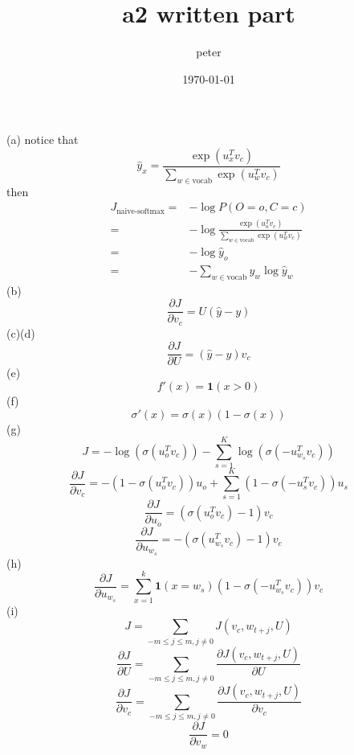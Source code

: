 \documentclass[UTF8]{ctexart}
\title{a2 written part}
\author{peter}
\date{\today}
\begin{document}
\maketitle
\noindent
(a) notice that
\begin{equation}
	{\hat{y}}_x = \frac{\exp{{(u^T_xv_c)}}}{\sum\limits_{w\in\text{vocab}}\exp{(u^T_wv_c)}}
	\end{equation}
then
\begin{align}
J_{\text{naive-softmax}} =& -\log P(O=o, C=c)\\
=&-\log\frac{\exp{{(u^T_ov_c)}}}{\sum\limits_{w\in\text{vocab}}\exp{(u^T_wv_c)}}\\
=&-\log\hat{y}_o\\
=&-\sum\limits_{w\in\text{vocab}}y_w\log{\hat{y}_w}
\end{align}
(b)
\begin{equation}
    \frac{\partial{J}}{\partial{v_c}} = U(\hat{y}-y)
\end{equation}
(c)(d)
\begin{equation}
    \frac{\partial{J}}{\partial{U}} = (\hat{y}-y)v_c
\end{equation}
(e)
\begin{equation}
    f'(x) = \mathbf{1}(x>0) 
\end{equation}
(f)
\begin{equation}
    \sigma '(x) = \sigma (x)(1-\sigma (x))
\end{equation}
(g)
\begin{equation}
    J = -\log(\sigma(u^T_o v_c))
    - \sum\limits_{s=1}^K \log (\sigma (-u^T_{w_s}v_c))
\end{equation}
\begin{equation}
    \frac{\partial{J}}{\partial{v_c}} = 
    - (1-\sigma(u_o^T v_c))u_o +
    \sum\limits_{s=1}^K (1-\sigma(-u_s^T v_c))u_s 
\end{equation}
\begin{equation}
    \frac{\partial{J}}{\partial{u_o}} = 
    (\sigma(u_o^T v_c)-1)v_c
\end{equation}
\begin{equation}
    \frac{\partial{J}}{\partial{u_{w_s}}}
    =-(\sigma(u^T_{w_s} v_c)-1)v_c
\end{equation}
(h)
\begin{equation}
    \frac{\partial{J}}{\partial{u_{w_s}}}
    = \sum\limits_{x=1}^k \mathbf{1}(x=w_s)(1-\sigma(-u^T_{w_s} v_c))v_c
\end{equation}
(i)
\begin{equation}
    J = \sum_{-m\le j \le m,j\neq0}J(v_c,w_{t+j},U)
\end{equation}
\begin{equation}
    \frac{\partial{J}}{\partial{U}} = \sum_{-m\le j \le m,j\neq0}
    \frac{\partial{J(v_c, w_{t+j}, U)}}{\partial{U}}
\end{equation}
\begin{equation}
    \frac{\partial{J}}{\partial{v_c}} = \sum_{-m\le j \le m,j\neq0}
    \frac{\partial{J(v_c, w_{t+j}, U)}}{\partial{v_c}}
\end{equation}
\begin{equation}
    \frac{\partial{J}}{\partial{v_w}} = 0
\end{equation}
\end{document}
